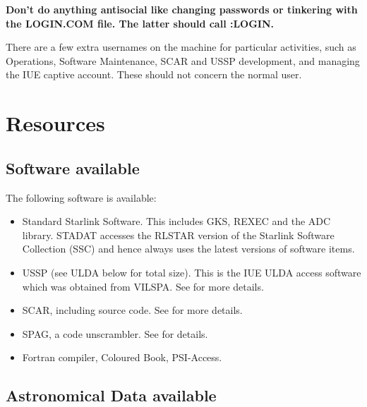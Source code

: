 \documentclass[nolof,11pt,noabs]{starlink}
\begin{document}
\textbf{Don't do anything antisocial like changing passwords or tinkering with the
LOGIN.COM file. The latter should call \@SSC:LOGIN.}

There are a few extra usernames on the machine for particular activities,
such as Operations, Software Maintenance, SCAR and USSP development, and
managing the IUE captive account.
These should not concern the normal user.

\section{Resources}

\subsection{Software available}

The following software is available:
\begin{itemize}
\item Standard Starlink Software.
This includes GKS, REXEC and the ADC library.
STADAT accesses the RLSTAR version of the Starlink Software
Collection (SSC) and hence always uses the
latest versions of software items.
\item USSP (see ULDA below for total size).
This is the IUE ULDA access software which was obtained from VILSPA.
See  for more details.
\item SCAR, including source code.
See  for more details.
\item SPAG, a code unscrambler. See  for details.
\item Fortran compiler, Coloured Book, PSI-Access.
\end{itemize}


\subsection{Astronomical Data available}
\end{document}
